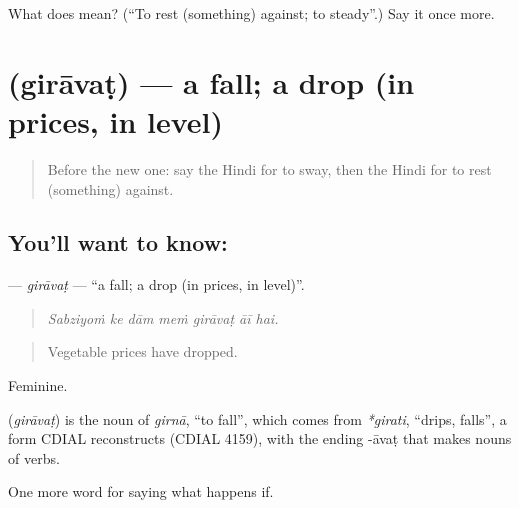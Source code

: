 \begin{tcolorbox}[breakable,colback=teal!4,colframe=teal!35!black,title={Before you move on}]
What does  mean? (\textquotedblleft{}To rest (something) against; to steady\textquotedblright{}.) Say it once more.
\end{tcolorbox}
\section[\texorpdfstring{\hi{गिरावट} (girāvaṭ)}{गिरावट (girāvaṭ)}]{ (girāvaṭ) — a fall; a drop (in prices, in level)}

\label{lesson:HI-C555-giravat}



\begin{quote}
Before the new one: say the Hindi for to sway, then the Hindi for to rest (something) against.
\end{quote}

\subsection*{You'll want to know: }
\textbf{} — \emph{girāvaṭ} — \textquotedblleft{}a fall; a drop (in prices, in level)\textquotedblright{}.

\begin{quote}
      
\end{quote}

\begin{quote}
\emph{Sabziyoṁ ke dām meṁ girāvaṭ āī hai.}
\end{quote}

\begin{quote}
Vegetable prices have dropped.
\end{quote}

Feminine.

\begin{cousinweb}
\textbf{} (\emph{girāvaṭ}) is the noun of \emph{girnā}, \textquotedblleft{}to fall\textquotedblright{}, which comes from \emph{*girati}, \textquotedblleft{}drips, falls\textquotedblright{}, a form CDIAL reconstructs (CDIAL 4159), with the ending -āvaṭ that makes nouns of verbs.
\end{cousinweb}

\begin{grammarlens}[title={What you've built}]
One more word for saying what happens if.
\end{grammarlens}

